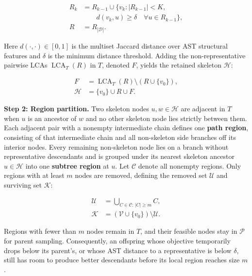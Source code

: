 \documentclass{article}
\begin{document}
\[
\begin{aligned}
R_k &= R_{k-1} \cup \bigl\{v_k : |R_{k-1}| < K,\\
&\qquad d(v_k,u)\geq\delta\quad\forall u\in R_{k-1}\bigr\},\\
R &= R_{|\mathcal D|}.
\end{aligned}
\tag{1}
\]

Here \(d(\cdot,\cdot)\in[0,1]\) is the multiset Jaccard distance over AST structural features and \(\delta\) is the minimum distance threshold. Adding the non-representative pairwise LCAs \(\operatorname{LCA}_T(R)\) in \(T\), denoted \(F\), yields the retained skeleton \(\mathcal H\):

\[
\begin{aligned}
F &= \operatorname{LCA}_T(R)\setminus(R\cup\{v_0\}),\\
\mathcal H &= \{v_0\}\cup R\cup F.
\end{aligned}
\tag{2}
\]

\textbf{Step 2: Region partition.} Two skeleton nodes \(u,w\in\mathcal H\) are adjacent in \(T\) when \(u\) is an ancestor of \(w\) and no other skeleton node lies strictly between them. Each adjacent pair with a nonempty intermediate chain defines one \textbf{path region}, consisting of that intermediate chain and all non-skeleton side branches off its interior nodes. Every remaining non-skeleton node lies on a branch without representative descendants and is grouped under its nearest skeleton ancestor \(u\in\mathcal H\) into one \textbf{subtree region} at \(u\). Let \(\mathcal C\) denote all nonempty regions. Only regions with at least \(m\) nodes are removed, defining the removed set \(\mathcal U\) and surviving set \(\mathcal K\):

\[
\begin{aligned}
\mathcal U &= \bigcup_{C\in\mathcal C:\,|C|\geq m} C,\\
\mathcal K &= (\mathcal V\cup\{v_0\})\setminus\mathcal U.
\end{aligned}
\tag{3}
\]

Regions with fewer than \(m\) nodes remain in \(T\), and their feasible nodes stay in \(\mathcal P\) for parent sampling. Consequently, an offspring whose objective temporarily drops below its parent's, or whose AST distance to a representative is below \(\delta\), still has room to produce better descendants before its local region reaches size \(m\).
\end{document}
